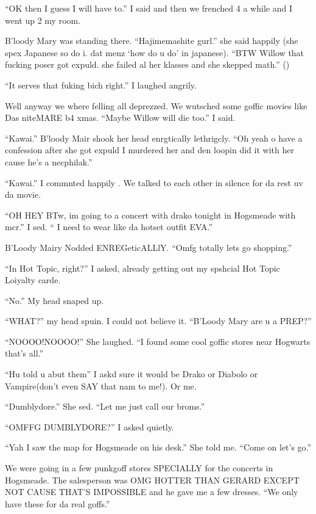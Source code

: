 \enquote{OK then I guess I will have to.} I said and then we frenched 4 a while and I went up 2 my room.

B'loody Mary was standing there. \enquote{Hajimemashite gurl.} she said happily (she spex Japanese so do i. dat menz \enquote*{how do u do} in japanese). \enquote{BTW Willow that fucking poser got expuld. she failed al her klasses and she skepped math.} ()

\enquote{It serves that fuking bich right.} I laughed angrily.

Well anyway we where felling all deprezzed. We wutsched some goffic movies like Das niteMARE b4 xmas. \enquote{Maybe Willow will die too.} I said.

\enquote{Kawai.} B'loody Mair shook her head enrgtically lethrigcly. \enquote{Oh yeah o have a confession after she got expuld I murdered her and den loopin did it with her cause he's a necphilak.}

\enquote{Kawai.} I commnted happily . We talked to each other in silence for da rest uv da movie.

\enquote{OH HEY BTw, im going to a concert with drako tonight in Hogsmeade with mcr.} I sed. \enquote{ I need to wear like da hotset outfit EVA\@.}

B'Loody Mairy Nodded ENREGeticALLlY\@. \enquote{Omfg totally lets go shopping.}

\enquote{In Hot Topic, right?} I asked, already getting out my spshcial Hot Topic Loiyalty carde.

\enquote{No.} My head snaped up.

\enquote{WHAT\@?} my head spuin. I could not believe it. \enquote{B'Loody Mary are u a PREP\@?}

\enquote{NOOOO!NOOOO\@!} She laughed. \enquote{I found some cool goffic stores near Hogwarts that's all.}

\enquote{Hu told u abut them} I askd sure it would be Drako or Diabolo or Vampire(don't even SAY that nam to me!). Or me.

\enquote{Dumblydore.} She sed. \enquote{Let me just call our broms.}

\enquote{OMFFG DUMBLYDORE\@?} I asked quietly.

\enquote{Yah I saw the map for Hogsmeade on his desk.} She told me. \enquote{Come on let's go.}

We were going in a few punkgoff stores SPECIALLY for the concerts in Hogsmeade. The salesperson was OMG HOTTER THAN GERARD EXCEPT NOT CAUSE THAT'S IMPOSSIBLE and he gave me a few dresses. \enquote{We only have these for da real goffs.}

